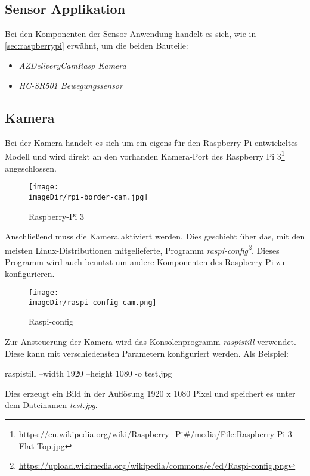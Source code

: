 \subsection{Sensor Applikation}
\label{sec:sensor-application}

Bei den Komponenten der Sensor-Anwendung handelt es sich, wie in \autoref{sec:raspberrypi} erwähnt, um die beiden Bauteile:

\begin{itemize}
	\item \emph{AZDeliveryCamRasp Kamera}
	\item \emph{HC-SR501 Bewegungssensor}
\end{itemize}

\subsection{Kamera}

Bei der Kamera handelt es sich um ein eigens für den Raspberry Pi entwickeltes Modell und wird direkt an den vorhanden Kamera-Port des Raspberry Pi 3\footnote{\url{https://en.wikipedia.org/wiki/Raspberry_Pi\#/media/File:Raspberry-Pi-3-Flat-Top.jpg}} angeschlossen.

\begin{figure}[h]
	\centering
	\texttt{[image: \\imageDir/rpi-border-cam.jpg]}
	\caption{Raspberry-Pi 3}
	\label{fig:rpi-border-cam}
\end{figure}

Anschließend muss die Kamera aktiviert werden. Dies geschieht über das, mit den meisten Linux-Distributionen mitgelieferte, Programm \emph{raspi-config\footnote{\url{https://upload.wikimedia.org/wikipedia/commons/e/ed/Raspi-config.png}}}. Dieses Programm wird auch benutzt um andere Komponenten des Raspberry Pi zu konfigurieren.

\begin{figure}[h]
	\centering
	\texttt{[image: \\imageDir/raspi-config-cam.png]}
	\caption{Raspi-config}
	\label{fig:raspi-config-cam}
\end{figure}

Zur Ansteuerung der Kamera wird das Konsolenprogramm \emph{raspistill} verwendet. Diese kann mit verschiedensten Parametern konfiguriert werden. Als Beispiel:\\
\newline
\begin{code}
	raspistill --width 1920 --height 1080 -o test.jpg\\
\end{code}
\newline
Dies erzeugt ein Bild in der Auflösung 1920 x 1080 Pixel und speichert es unter dem Dateinamen \emph{test.jpg}.

